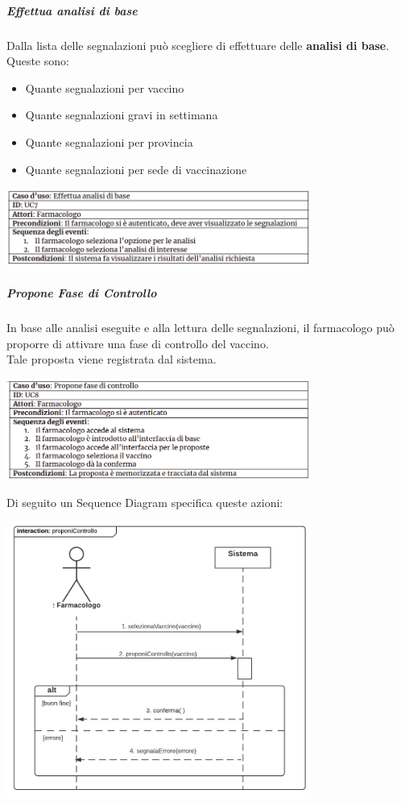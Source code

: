\documentclass{article}
\begin{document}
\subparagraph*{Effettua analisi di base}
Dalla lista delle segnalazioni può scegliere di effettuare delle \textbf{analisi di base}. Queste sono:
\begin{itemize}
    \item Quante segnalazioni per vaccino
    \item Quante segnalazioni gravi in settimana
    \item Quante segnalazioni per provincia 
    \item Quante segnalazioni per sede di vaccinazione
\end{itemize}
\begin{center}
    \includegraphics[width=0.75\textwidth]{pictures/UC7.png}
\end{center}
\subparagraph*{Propone Fase di Controllo}
In base alle analisi eseguite e alla lettura delle segnalazioni, il farmacologo può proporre di attivare una fase di controllo del vaccino.\\
Tale proposta viene registrata dal sistema.
\begin{center}
    \includegraphics[width=0.75\textwidth]{pictures/UC8.png}
\end{center}
Di seguito un Sequence Diagram specifica queste azioni:
\begin{center}
    \includegraphics[width=0.75\textwidth]{pictures/SDFarmacolo2_proponeControllo.png}
\end{center}
\end{document}
